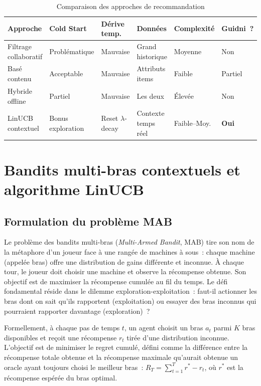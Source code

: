 \begin{table}[H]
    \centering
    \caption{Comparaison des approches de recommandation}
    \label{tab:reco_approaches}
    \small
    \begin{tabular}{p{2.8cm} p{2.2cm} p{2cm} p{2.2cm} p{2.0cm} p{2.0cm}}
        \toprule
        \textbf{Approche} & \textbf{Cold Start} & \textbf{Dérive temp.} &
        \textbf{Données} & \textbf{Complexité} & \textbf{Guidni~?} \\
        \midrule
        Filtrage collaboratif & Problématique & Mauvaise & Grand historique & Moyenne & Non \\[7pt]
        Basé contenu & Acceptable & Mauvaise & Attributs items & Faible & Partiel \\[7pt]
        Hybride offline & Partiel & Mauvaise & Les deux & Élevée & Non \\[7pt]
        LinUCB contextuel & Bonus exploration & Reset $\lambda$-decay & Contexte temps réel & Faible--Moy. & \textbf{Oui} \\
        \bottomrule
    \end{tabular}
\end{table}


\section{Bandits multi-bras contextuels et algorithme LinUCB}

\subsection{Formulation du problème MAB}

Le problème des bandits multi-bras (\textit{Multi-Armed Bandit}, MAB) tire son nom de la métaphore
d'un joueur face à une rangée de machines à sous~: chaque machine (appelée \og{}bras\fg{}) offre
une distribution de gains différente et inconnue. À chaque tour, le joueur doit choisir une
machine et observe la récompense obtenue. Son objectif est de maximiser la récompense cumulée au
fil du temps. Le défi fondamental réside dans le dilemme exploration-exploitation~: faut-il
actionner les bras dont on sait qu'ils rapportent (exploitation) ou essayer des bras inconnus
qui pourraient rapporter davantage (exploration)~?

Formellement, à chaque pas de temps $t$, un agent choisit un bras $a_t$ parmi $K$ bras
disponibles et reçoit une récompense $r_t$ tirée d'une distribution inconnue. L'objectif est de
minimiser le regret cumulé, défini comme la différence entre la récompense totale obtenue et la
récompense maximale qu'aurait obtenue un oracle ayant toujours choisi le meilleur bras~:
$R_T = \sum_{t=1}^{T} r^* - r_t$, où $r^*$ est la récompense espérée du bras optimal.

